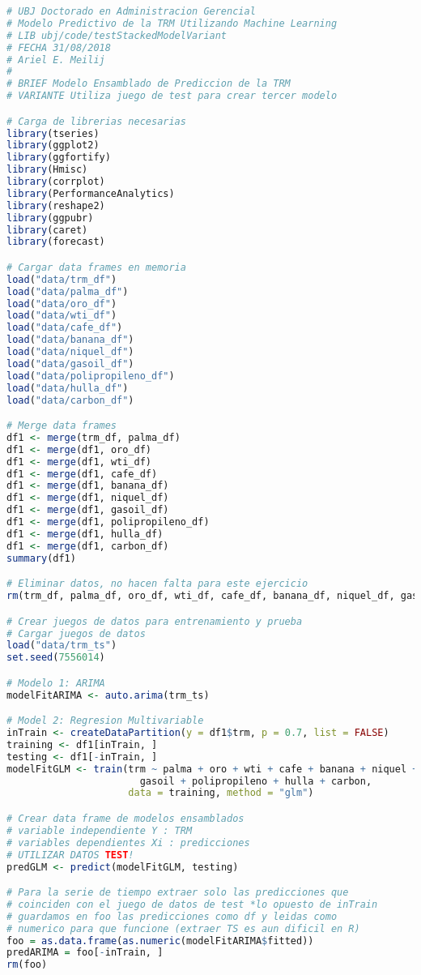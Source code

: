 \begin{lstlisting}[language=R]
# UBJ Doctorado en Administracion Gerencial
# Modelo Predictivo de la TRM Utilizando Machine Learning
# LIB ubj/code/testStackedModelVariant
# FECHA 31/08/2018
# Ariel E. Meilij
#
# BRIEF Modelo Ensamblado de Prediccion de la TRM
# VARIANTE Utiliza juego de test para crear tercer modelo

# Carga de librerias necesarias
library(tseries)
library(ggplot2)
library(ggfortify)
library(Hmisc)
library(corrplot)
library(PerformanceAnalytics)
library(reshape2)
library(ggpubr)
library(caret)
library(forecast)

# Cargar data frames en memoria
load("data/trm_df")
load("data/palma_df")
load("data/oro_df")
load("data/wti_df")
load("data/cafe_df")
load("data/banana_df")
load("data/niquel_df")
load("data/gasoil_df")
load("data/polipropileno_df")
load("data/hulla_df")
load("data/carbon_df")

# Merge data frames
df1 <- merge(trm_df, palma_df)
df1 <- merge(df1, oro_df)
df1 <- merge(df1, wti_df)
df1 <- merge(df1, cafe_df)
df1 <- merge(df1, banana_df)
df1 <- merge(df1, niquel_df)
df1 <- merge(df1, gasoil_df)
df1 <- merge(df1, polipropileno_df)
df1 <- merge(df1, hulla_df)
df1 <- merge(df1, carbon_df)
summary(df1)

# Eliminar datos, no hacen falta para este ejercicio
rm(trm_df, palma_df, oro_df, wti_df, cafe_df, banana_df, niquel_df, gasoil_df, polipropileno_df, hulla_df, carbon_df)

# Crear juegos de datos para entrenamiento y prueba
# Cargar juegos de datos
load("data/trm_ts")
set.seed(7556014)

# Modelo 1: ARIMA
modelFitARIMA <- auto.arima(trm_ts)

# Model 2: Regresion Multivariable
inTrain <- createDataPartition(y = df1$trm, p = 0.7, list = FALSE)
training <- df1[inTrain, ]
testing <- df1[-inTrain, ]
modelFitGLM <- train(trm ~ palma + oro + wti + cafe + banana + niquel +
                       gasoil + polipropileno + hulla + carbon,
                     data = training, method = "glm")

# Crear data frame de modelos ensamblados
# variable independiente Y : TRM
# variables dependientes Xi : predicciones
# UTILIZAR DATOS TEST!
predGLM <- predict(modelFitGLM, testing)

# Para la serie de tiempo extraer solo las predicciones que
# coinciden con el juego de datos de test *lo opuesto de inTrain
# guardamos en foo las predicciones como df y leidas como
# numerico para que funcione (extraer TS es aun dificil en R)
foo = as.data.frame(as.numeric(modelFitARIMA$fitted))
predARIMA = foo[-inTrain, ]
rm(foo)


\end{lstlisting}

